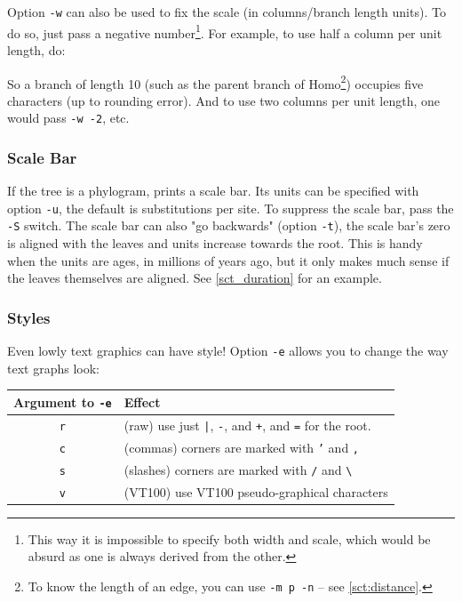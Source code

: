 Option \texttt{-w} can also be used to fix the scale (in columns/branch length
units). To do so, just pass a negative number\footnote{This way it is
impossible to specify both width and scale, which would be absurd as one is
always derived from the other.}. For example, to use half a column per unit
length, do:

\begin{samepage}


\end{samepage}

\noindent{} So a branch of length 10 (such as the parent branch of
Homo\footnote{To know the length of an edge, you can use \distance{} \texttt{-m
p -n} -- see \ref{sct:distance}.}) occupies five characters (up to rounding
error). And to use two columns per unit length, one would pass \texttt{-w -2},
etc.

\subsubsection{Scale Bar}

If the tree is a phylogram, \display{} prints a scale bar. Its units can be
specified with option \texttt{-u}, the default is substitutions per site. To
suppress the scale bar, pass the \texttt{-S} switch. The scale bar can also "go
backwards" (option \texttt{-t}), \ie{} the scale bar's zero is aligned with the
leaves and units increase towards the root. This is handy when the units are
ages, \eg{} in millions of years ago, but it only makes much sense if the leaves
themselves are aligned. See \ref{sct_duration} for an example.

\subsubsection{Styles}

Even lowly text graphics can have style! Option \texttt{-e} allows you to
change the way text graphs look:

\begin{center}
\begin{tabular}{cl}
Argument to \texttt{-e} & Effect \\
\hline 
\texttt{r} & (raw) use just \texttt{|}, \texttt{-}, and \texttt{+}, and \texttt{=} for the root. \\
\texttt{c} & (commas) corners are marked with \texttt{'} and \texttt{,} \\
\texttt{s} & (slashes) corners are marked with \texttt{/} and \texttt{\textbackslash} \\
\texttt{v} & (VT100) use VT100 pseudo-graphical characters
\end{tabular}
\end{center}

